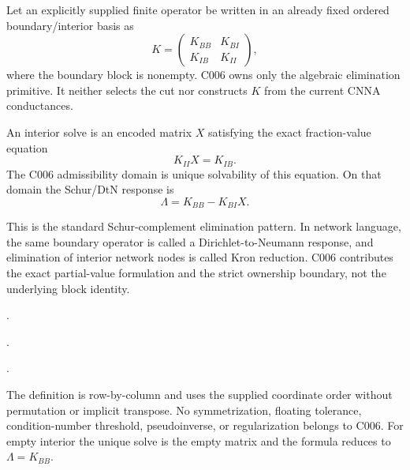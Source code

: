Let an explicitly supplied finite operator be written in an already fixed
ordered boundary/interior basis as
\[
 K=
 \begin{pmatrix}
  K_{BB} & K_{BI}\\
  K_{IB} & K_{II}
 \end{pmatrix},
\]
where the boundary block is nonempty.  C006 owns only the algebraic
elimination primitive.  It neither selects the cut nor constructs $K$ from the
current CNNA conductances.

An interior solve is an encoded matrix $X$ satisfying the exact fraction-value
equation
\[
 K_{II}X=K_{IB}.
\]
The C006 admissibility domain is unique solvability of this equation.  On that
domain the Schur/DtN response is
\[
 \Lambda = K_{BB}-K_{BI}X.
\]

This is the standard Schur-complement elimination pattern.  In network language, the same boundary operator is called a Dirichlet-to-Neumann response, and elimination of interior network nodes is called Kron reduction.  C006 contributes the exact partial-value formulation and the strict ownership boundary, not the underlying block identity.

\cite[Horn--Zhang, Basic Properties, pp.~17--46]{Zhang2005SchurComplement}.

\cite[Sec.~I, Eqs.~(1)--(2), pp.~150--151]{DoerflerBullo2013KronReduction}.

\cite[Abstract and Sec.~1, p.~115]{CurtisIngermanMorrow1998Response}.

The definition is row-by-column and uses the supplied coordinate order without
permutation or implicit transpose.  No symmetrization, floating tolerance,
condition-number threshold, pseudoinverse, or regularization belongs to C006.
For empty interior the unique solve is the empty matrix and the formula reduces
to $\Lambda=K_{BB}$.


